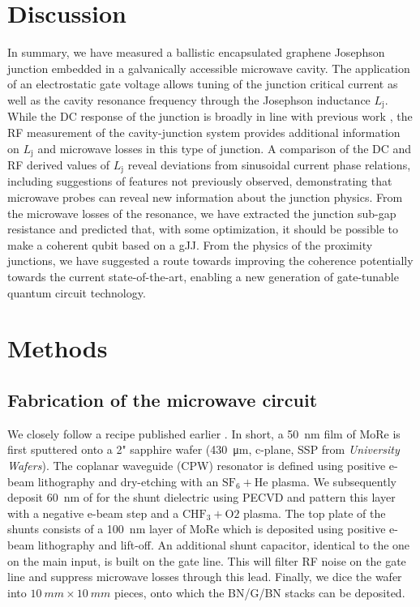 \section{Discussion}

In summary, we have measured a ballistic encapsulated graphene Josephson junction embedded in a galvanically accessible microwave cavity.
The application of an electrostatic gate voltage allows tuning of the junction critical current as well as the cavity resonance frequency through the Josephson inductance $L_\text{j}$.
While the DC response of the junction is broadly in line with previous work \cite{caladoBallisticJosephsonJunctions2015d,benshalomQuantumOscillationsCritical2015,leeUltimatelyShortBallistic2015}, the RF measurement of the cavity-junction system provides additional information on $L_\text{j}$ and microwave losses in this type of junction.
A comparison of the DC and RF derived values of $L_\text{j}$ reveal deviations from sinusoidal current phase relations, including suggestions of features not previously observed, demonstrating that microwave probes can reveal new information about the junction physics. 
From the microwave losses of the resonance, we have extracted the junction sub-gap resistance and predicted that, with some optimization, it should be possible to make a coherent qubit based on a gJJ.
From the physics of the proximity junctions, we have suggested a route towards improving the coherence potentially towards the current state-of-the-art, enabling a new generation of gate-tunable quantum circuit technology. 


\section{Methods}
\subsection{Fabrication of the microwave circuit}
We closely follow a recipe published earlier \cite{bosmanBroadbandArchitectureGalvanically2015c,singhMolybdenumrheniumAlloyBased2014}.
In short, a \SI{50}{nm} film of MoRe is first sputtered onto a 2" sapphire wafer (\SI{430}{\micro m}, c-plane, SSP from \textit{University Wafers}).
The coplanar waveguide (CPW) resonator is defined using positive e-beam lithography and dry-etching with an $\mathrm{SF_6 + He}$ plasma.
We subsequently deposit \SI{60}{nm} of  for the shunt dielectric using PECVD and pattern this layer with a negative e-beam step and a $\mathrm{CHF_3 + O2}$ plasma.
The top plate of the shunts consists of a \SI{100}{nm} layer of MoRe which is deposited using positive e-beam lithography and lift-off.
An additional shunt capacitor, identical to the one on the main input, is built on the gate line.
This will filter RF noise on the gate line and suppress microwave losses through this lead.
Finally, we dice the wafer into $\SI{10}{mm}\times\SI{10}{mm}$ pieces, onto which the BN/G/BN stacks can be deposited.

